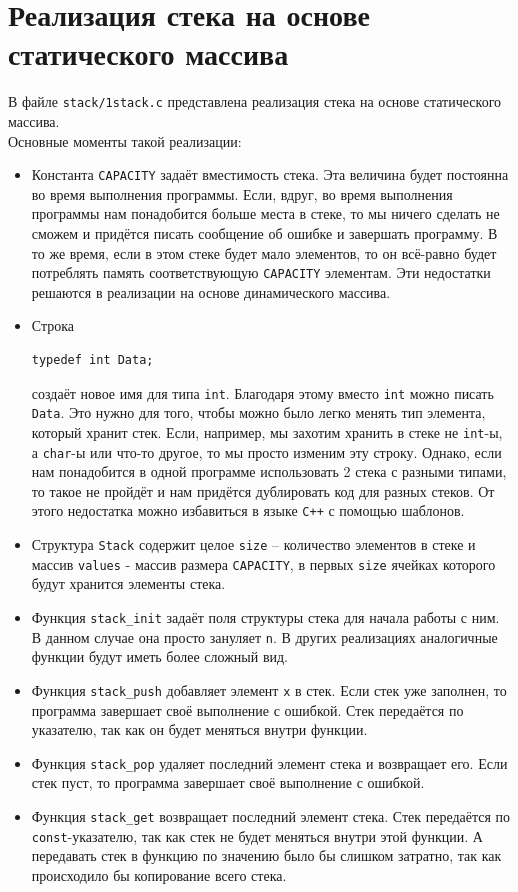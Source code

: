 \documentclass{article}
\begin{document}
\section*{Реализация стека на основе статического массива}
В файле \texttt{stack/1stack.c} представлена реализация стека на основе статического массива.\\ 
Основные моменты такой реализации:
\begin{itemize}
\item Константа \texttt{CAPACITY} задаёт вместимость стека. Эта величина будет постоянна во время выполнения программы. Если, вдруг, во время выполнения программы нам понадобится больше места в стеке, то мы ничего сделать не сможем и придётся писать сообщение об ошибке и завершать программу. В то же время, если в этом стеке будет мало элементов, то он всё-равно будет потреблять память соответствующую \texttt{CAPACITY} элементам. Эти недостатки решаются в реализации на основе динамического массива.
\item Строка 
\begin{lstlisting}
typedef int Data;
\end{lstlisting}
создаёт новое имя для типа \texttt{int}. Благодаря этому вместо \texttt{int} можно писать \texttt{Data}. Это нужно для того, чтобы можно было легко менять тип элемента, который хранит стек. Если, например, мы захотим хранить в стеке не \texttt{int}-ы, а \texttt{char}-ы или что-то другое, то мы просто изменим эту строку. Однако, если нам понадобится в одной программе использовать 2 стека с разными типами, то такое не пройдёт и нам придётся дублировать код для разных стеков. От этого недостатка можно избавиться в языке \texttt{C++} с помощью шаблонов.
\item Структура \texttt{Stack} содержит целое \texttt{size} -- количество элементов в стеке и массив \texttt{values} - массив размера \texttt{CAPACITY}, в первых \texttt{size} ячейках которого будут хранится элементы стека.
\item Функция \texttt{stack\_init} задаёт поля структуры стека для начала работы с ним. В данном случае она просто зануляет \texttt{n}. В других реализациях аналогичные функции будут иметь более сложный вид.
\item Функция \texttt{stack\_push} добавляет элемент \texttt{x} в стек. Если стек уже заполнен, то программа завершает своё выполнение с ошибкой. Стек передаётся по указателю, так как он будет меняться внутри функции.
\item Функция \texttt{stack\_pop} удаляет последний элемент стека и возвращает его. Если стек пуст, то программа завершает своё выполнение с ошибкой.
\item Функция \texttt{stack\_get} возвращает последний элемент стека. Стек передаётся по \texttt{const}-указателю, так как стек не будет меняться внутри этой функции. А передавать стек в функцию по значению было бы слишком затратно, так как происходило бы копирование всего стека.
\end{itemize}
\end{document}

